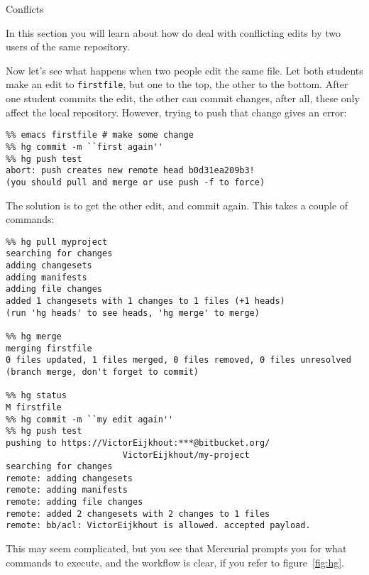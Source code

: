  {Conflicts}

\begin{purpose}
  In this section you will learn about how do deal with conflicting
  edits by two users of the same repository.
\end{purpose}

Now let's see what happens when two people edit the same file.
Let both students make an edit to \verb+firstfile+, but one to the
top, the other to the bottom. After one student commits the edit, the
other can commit changes, after all, these only affect the local repository.
However, trying to push that change gives an error:
\begin{verbatim}
%% emacs firstfile # make some change
%% hg commit -m ``first again''
%% hg push test
abort: push creates new remote head b0d31ea209b3!
(you should pull and merge or use push -f to force)
\end{verbatim}
The solution is to get the other edit, and commit again. This takes a 
couple of commands:
{\small
\begin{verbatim}
%% hg pull myproject
searching for changes
adding changesets
adding manifests
adding file changes
added 1 changesets with 1 changes to 1 files (+1 heads)
(run 'hg heads' to see heads, 'hg merge' to merge)

%% hg merge
merging firstfile
0 files updated, 1 files merged, 0 files removed, 0 files unresolved
(branch merge, don't forget to commit)

%% hg status
M firstfile
%% hg commit -m ``my edit again''
%% hg push test
pushing to https://VictorEijkhout:***@bitbucket.org/
                       VictorEijkhout/my-project
searching for changes
remote: adding changesets
remote: adding manifests
remote: adding file changes
remote: added 2 changesets with 2 changes to 1 files
remote: bb/acl: VictorEijkhout is allowed. accepted payload.
\end{verbatim}
}

This may seem complicated, but you see that Mercurial prompts you 
for what commands to execute, and the workflow is clear, if you refer
to figure~\ref{fig:hg}.


